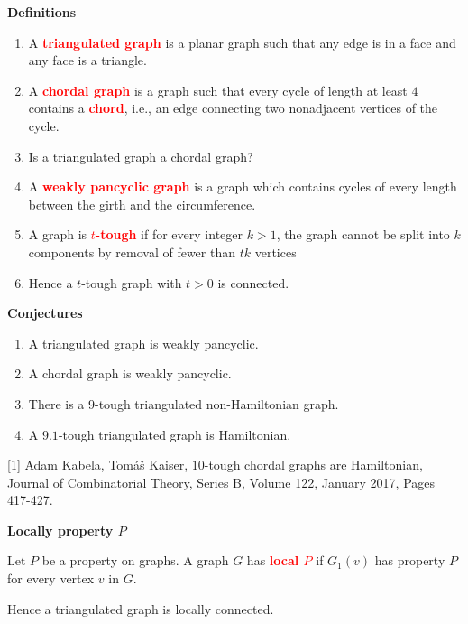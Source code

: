 \documentclass{beamer}
\title[]{}
\author[]{ }
\date[]{}
\theoremstyle{plain}
\theoremstyle{definition}
\begin{document}
\begin{frame}{\bf Definitions}


\begin{enumerate}
\item A \textcolor{red}{\bf triangulated graph} is a planar graph such that any edge is in a face and any face is a triangle.
\item A \textcolor{red}{\bf chordal graph} is a graph such that every cycle of length at least $4$ contains a \textcolor{red}{\bf chord}, i.e., an edge connecting two nonadjacent vertices of the cycle.
\item Is a triangulated graph a chordal graph?
\item A \textcolor{red}{\bf weakly  pancyclic graph} is a graph which contains cycles of every length between the girth and the circumference.
\item A graph is \textcolor{red}{\bf $t$-tough}  if for every integer $k>1$, the graph cannot be split into $k$ components by removal of fewer than $tk$ vertices
\item Hence a $t$-tough graph with $t>0$ is connected.
\end{enumerate}

\end{frame}









\begin{frame}{\bf Conjectures}

\begin{enumerate}
\item A triangulated graph is weakly  pancyclic.
\item A chordal graph is weakly  pancyclic.
\item There is a  $9$-tough triangulated non-Hamiltonian graph.
\item A $9.1$-tough triangulated graph is Hamiltonian.
\end{enumerate}
\bigskip



[1] Adam Kabela, Tom\'{a}\v{s} Kaiser, $10$-tough chordal graphs are Hamiltonian, Journal of Combinatorial Theory, Series B, Volume 122, January 2017, Pages 417-427.
\end{frame}


\begin{frame}{\bf Locally property $P$}

Let $P$ be a property on graphs.
A graph $G$ has \textcolor{red}{\bf local $P$} if $G_1(v)$ has property $P$ for every vertex $v$ in $G$.
\bigskip


Hence a triangulated graph is locally connected.
\end{frame}
\end{document}
